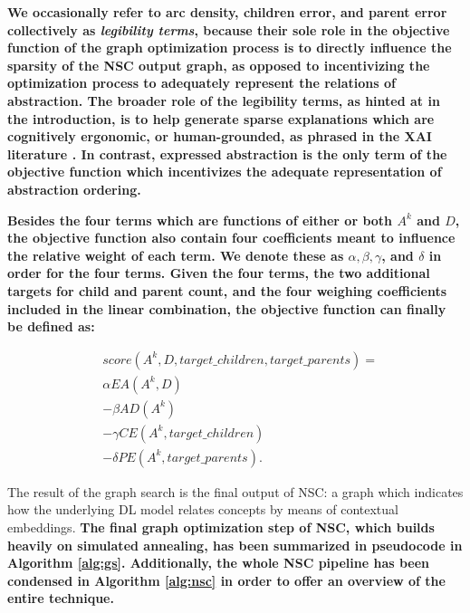 \textbf{We occasionally refer to arc density, children error, and parent error collectively as \textit{legibility terms}, because their sole role in the objective function of the graph optimization process is to directly influence the sparsity of the NSC output graph, as opposed to incentivizing the optimization process to adequately represent the relations of abstraction. The broader role of the legibility terms, as hinted at in the introduction, is to help generate sparse explanations which are cognitively ergonomic, or human-grounded, as phrased in the XAI literature \citep{madsen_post-hoc_2021}. In contrast, expressed abstraction is the only term of the objective function which incentivizes the adequate representation of abstraction ordering.}

\textbf{Besides the four terms which are functions of either or both $A^k$ and $D$, the objective function also contain four coefficients meant to influence the relative weight of each term. We denote these as $\alpha, \beta, \gamma$, and $\delta$ in order for the four terms. Given the four terms, the two additional targets for child and parent count, and the four weighing coefficients included in the linear combination, the objective function can finally be defined as:}

\begin{align*}
     & score(A^k, D, target\_children, target\_parents) = \\
     & \alpha EA(A^k, D)                                  \\
     & - \beta AD(A^k)                                    \\
     & - \gamma CE(A^k, target\_children)                 \\
     & - \delta PE(A^k, target\_parents).
\end{align*}

The result of the graph search is the final output of NSC: a graph which indicates how the underlying DL model relates concepts by means of contextual embeddings. \textbf{The final graph optimization step of NSC, which builds heavily on simulated annealing, has been summarized in pseudocode in Algorithm \ref{alg:gs}. Additionally, the whole NSC pipeline has been condensed in Algorithm \ref{alg:nsc} in order to offer an overview of the entire technique.}

